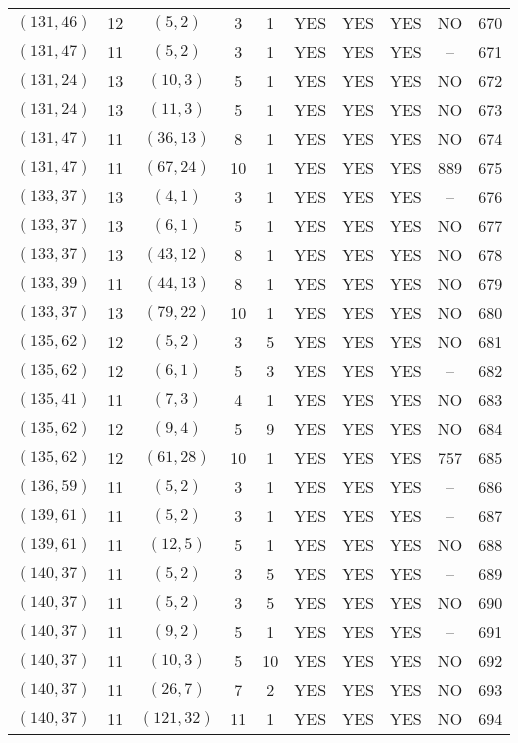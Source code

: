 \begin{longtable}{|c|c|c|c|c|c|c|c|c|c|}
$(131, 46)$ & 12 & $(5, 2)$ & 3 & 1 & YES & YES & YES & NO & 670\\
$(131, 47)$ & 11 & $(5, 2)$ & 3 & 1 & YES & YES & YES & -- & 671\\
$(131, 24)$ & 13 & $(10, 3)$ & 5 & 1 & YES & YES & YES & NO & 672\\
$(131, 24)$ & 13 & $(11, 3)$ & 5 & 1 & YES & YES & YES & NO & 673\\
$(131, 47)$ & 11 & $(36, 13)$ & 8 & 1 & YES & YES & YES & NO & 674\\
$(131, 47)$ & 11 & $(67, 24)$ & 10 & 1 & YES & YES & YES & 889 & 675\\
$(133, 37)$ & 13 & $(4, 1)$ & 3 & 1 & YES & YES & YES & -- & 676\\
$(133, 37)$ & 13 & $(6, 1)$ & 5 & 1 & YES & YES & YES & NO & 677\\
$(133, 37)$ & 13 & $(43, 12)$ & 8 & 1 & YES & YES & YES & NO & 678\\
$(133, 39)$ & 11 & $(44, 13)$ & 8 & 1 & YES & YES & YES & NO & 679\\
$(133, 37)$ & 13 & $(79, 22)$ & 10 & 1 & YES & YES & YES & NO & 680\\
$(135, 62)$ & 12 & $(5, 2)$ & 3 & 5 & YES & YES & YES & NO & 681\\
$(135, 62)$ & 12 & $(6, 1)$ & 5 & 3 & YES & YES & YES & -- & 682\\
$(135, 41)$ & 11 & $(7, 3)$ & 4 & 1 & YES & YES & YES & NO & 683\\
$(135, 62)$ & 12 & $(9, 4)$ & 5 & 9 & YES & YES & YES & NO & 684\\
$(135, 62)$ & 12 & $(61, 28)$ & 10 & 1 & YES & YES & YES & 757 & 685\\
$(136, 59)$ & 11 & $(5, 2)$ & 3 & 1 & YES & YES & YES & -- & 686\\
$(139, 61)$ & 11 & $(5, 2)$ & 3 & 1 & YES & YES & YES & -- & 687\\
$(139, 61)$ & 11 & $(12, 5)$ & 5 & 1 & YES & YES & YES & NO & 688\\
$(140, 37)$ & 11 & $(5, 2)$ & 3 & 5 & YES & YES & YES & -- & 689\\
$(140, 37)$ & 11 & $(5, 2)$ & 3 & 5 & YES & YES & YES & NO & 690\\
$(140, 37)$ & 11 & $(9, 2)$ & 5 & 1 & YES & YES & YES & -- & 691\\
$(140, 37)$ & 11 & $(10, 3)$ & 5 & 10 & YES & YES & YES & NO & 692\\
$(140, 37)$ & 11 & $(26, 7)$ & 7 & 2 & YES & YES & YES & NO & 693\\
$(140, 37)$ & 11 & $(121, 32)$ & 11 & 1 & YES & YES & YES & NO & 694\\

\end{longtable}
